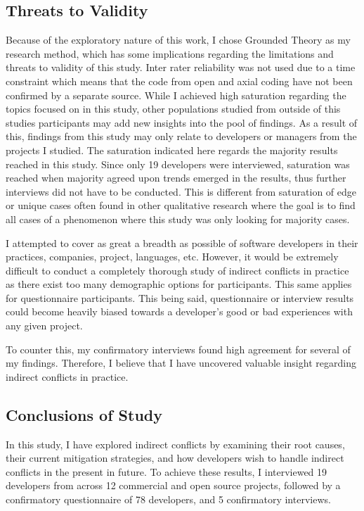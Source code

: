 \subsection{Threats to Validity}
Because of the exploratory nature of this work, I chose Grounded Theory as my research method, which has some implications regarding the
limitations and threats to validity of this study. Inter rater reliability was not used due to a time constraint which means
that the code from open and axial coding have not been confirmed by a separate source.
While I achieved high saturation regarding the topics focused on in this study, other
populations studied from outside of this studies participants may add new insights into the pool of findings. As a result of this, findings
from this study may only relate to developers or managers from the projects I studied. The saturation indicated here regards the majority
results reached in this study. Since only 19 developers were interviewed, saturation was reached when majority agreed upon
trends emerged in the results, thus further interviews did not have to be conducted. This is different from saturation of edge or
unique cases often found in other qualitative research where the goal is to find all cases of a phenomenon where this study
was only looking for majority cases.

I attempted to cover as great a breadth as possible of software developers in their practices, companies,
project, languages, etc. However, it would be extremely difficult to conduct a completely thorough study of indirect conflicts in practice
as there exist too many demographic options for participants. This same applies for questionnaire participants. This being said, questionnaire 
or interview results could become heavily biased towards a developer's good or bad experiences with any given project.

To counter this, my confirmatory interviews found high agreement for several of my findings. Therefore, I believe that
I have uncovered valuable insight regarding indirect conflicts in practice.

\subsection{Conclusions of Study}

In this study, I have explored indirect conflicts by examining their root causes, their current mitigation strategies, and how developers
wish to handle indirect conflicts in the present in future. To achieve these results, I interviewed 19 developers from across 12 commercial 
and open source projects, followed by a confirmatory questionnaire of 78 developers, and 5 confirmatory interviews.

